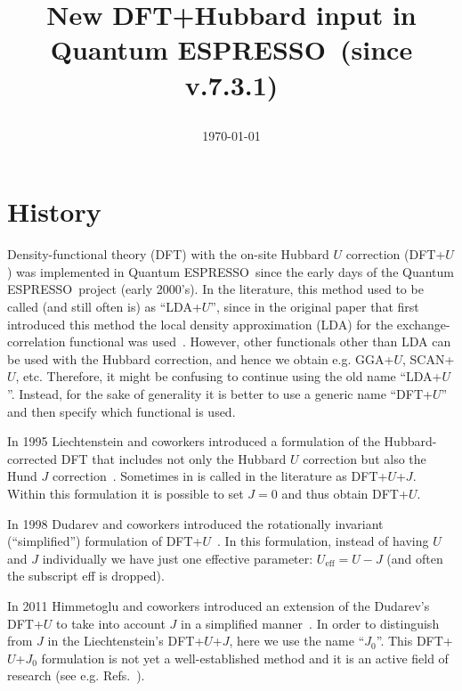 \documentclass[12pt,a4paper]{article}
\def\version{7.3.1}
\def\qe{{\sc Quantum ESPRESSO}}
\begin{document}
\author{}
\date{}


\title{
  \Huge New DFT+Hubbard input in \\ \qe\ (since v.\version)
  \date{\today}
}

\maketitle

\tableofcontents

\section{History}
\label{sec:history}

Density-functional theory (DFT) with the on-site Hubbard $U$ correction (DFT+$U$) was implemented in \qe\ since the early days of the \qe\ project (early 2000's). In the literature, this method used to be called (and still often is) as ``LDA+$U$'', since in the original paper that first introduced this method the local density approximation (LDA) for the exchange-correlation functional was used~\cite{Anisimov:1991}. However, other functionals other than LDA can be used with the Hubbard correction, and hence we obtain e.g. GGA+$U$, SCAN+$U$, etc. Therefore, it might be confusing to continue using the old name ``LDA+$U$''. Instead, for the sake of generality it is better to use a generic name ``DFT+$U$'' and then specify which functional is used. 

In 1995 Liechtenstein and coworkers introduced a formulation of the Hubbard-corrected DFT that includes not only the Hubbard $U$ correction but also the Hund $J$ correction~\cite{Liechtenstein:1995}. Sometimes in is called in the literature as DFT+$U$+$J$. Within this formulation it is possible to set $J=0$ and thus obtain DFT+$U$.  

In 1998 Dudarev and coworkers introduced the rotationally invariant (``simplified'') formulation of DFT+$U$~\cite{Dudarev:1998}. In this formulation, instead of having $U$ and $J$ individually we have just one effective parameter: $U_\mathrm{eff} = U - J$ (and often the subscript eff is dropped). 

In 2011 Himmetoglu and coworkers introduced an extension of the Dudarev's DFT+$U$ to take into account $J$ in a simplified manner~\cite{Himmetoglu:2011}. In order to distinguish from $J$ in the Liechtenstein's DFT+$U$+$J$, here we use the name ``$J_0$''. This DFT+$U$+$J_0$ formulation is not yet a well-established method and it is an active field of research (see e.g. Refs.~\cite{Bajaj:2017, Linscott:2018}).
\end{document}
